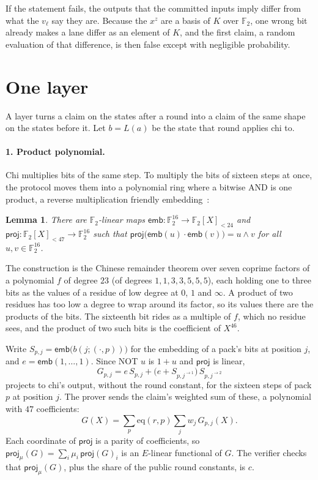 \documentclass[11pt]{article}
\newcommand{\F}{\mathbb{F}_2}
\newcommand{\E}{E}
\newcommand{\K}{K}
\newcommand{\eq}{\mathrm{eq}}
\newcommand{\along}[2]{#1^{\rightarrow #2}}
\newcommand{\emb}{\mathsf{emb}}
\newcommand{\proj}{\mathsf{proj}}
\newtheorem*{lemma}{Lemma}
\begin{document}
If the statement fails, the outputs that the committed inputs imply differ from what the $v_\ell$ say they are. Because the $x^z$ are a basis of $\K$ over $\F$, one wrong bit already makes a lane differ as an element of $\K$, and the first claim, a random evaluation of that difference, is then false except with negligible probability.

\section{One layer}\label{sec:layer}

A layer turns a claim on the states after a round into a claim of the same shape on the states before it. Let $b = L(a)$ be the state that round applies chi to.

\paragraph{1. Product polynomial.} Chi multiplies bits of the same step. To multiply the bits of sixteen steps at once, the protocol moves them into a polynomial ring where a bitwise AND is one product, a reverse multiplication friendly embedding~\cite{CCXY18}:

\begin{lemma}
There are $\F$-linear maps $\emb : \F^{16} \to \F[X]_{<24}$ and $\proj : \F[X]_{<47} \to \F^{16}$ such that $\proj\bigl(\emb(u) \cdot \emb(v)\bigr) = u \wedge v$ for all $u, v \in \F^{16}$.
\end{lemma}

The construction is the Chinese remainder theorem over seven coprime factors of a polynomial $f$ of degree $23$ (of degrees $1, 1, 3, 3, 5, 5, 5$), each holding one to three bits as the values of a residue of low degree at $0$, $1$ and $\infty$. A product of two residues has too low a degree to wrap around its factor, so its values there are the products of the bits. The sixteenth bit rides as a multiple of $f$, which no residue sees, and the product of two such bits is the coefficient of $X^{46}$.

Write $S_{p,j} = \emb\bigl(b(j; (\cdot, p))\bigr)$ for the embedding of a pack's bits at position $j$, and $e = \emb(1, \dots, 1)$. Since NOT $u$ is $1 + u$ and $\proj$ is linear,
\[
G_{p,j} = e\, S_{p,j} + \bigl(e + S_{p,\along{j}{1}}\bigr)\, S_{p,\along{j}{2}}
\]
projects to chi's output, without the round constant, for the sixteen steps of pack $p$ at position $j$. The prover sends the claim's weighted sum of these, a polynomial with $47$ coefficients:
\[
G(X) = \sum_{p} \eq(r, p) \sum_j w_j\, G_{p,j}(X).
\]
Each coordinate of $\proj$ is a parity of coefficients, so $\proj_\mu(G) = \sum_i \mu_i\, \proj(G)_i$ is an $\E$-linear functional of $G$. The verifier checks that $\proj_\mu(G)$, plus the share of the public round constants, is $c$.
\end{document}
